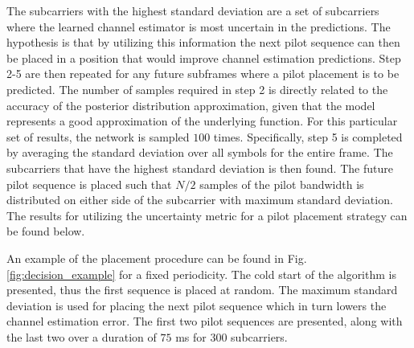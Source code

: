 The subcarriers with the highest standard deviation are a set of subcarriers where the learned channel estimator is most uncertain in the predictions. The hypothesis is that by utilizing this information the next pilot sequence can then be placed in a position that would improve channel estimation predictions. Step 2-5 are then repeated for any future subframes where a pilot placement is to be predicted. The number of samples required in step 2 is directly related to the accuracy of the posterior distribution approximation, given that the model represents a good approximation of the underlying function. For this particular set of results, the network is sampled $100$ times. Specifically, step 5 is completed by averaging the standard deviation over all symbols for the entire frame. The subcarriers that have the highest standard deviation is then found. The future pilot sequence is placed such that $N/2$ samples of the pilot bandwidth is distributed on either side of the subcarrier with maximum standard deviation. The results for utilizing the uncertainty metric for a pilot placement strategy can be found below. 

An example of the placement procedure can be found in Fig. \ref{fig:decision_example} for a fixed periodicity. The cold start of the algorithm is presented, thus the first sequence is placed at random. The maximum standard deviation is used for placing the next pilot sequence which in turn lowers the channel estimation error. The first two pilot sequences are presented, along with the last two over a duration of $75$ ms for $300$ subcarriers. 

